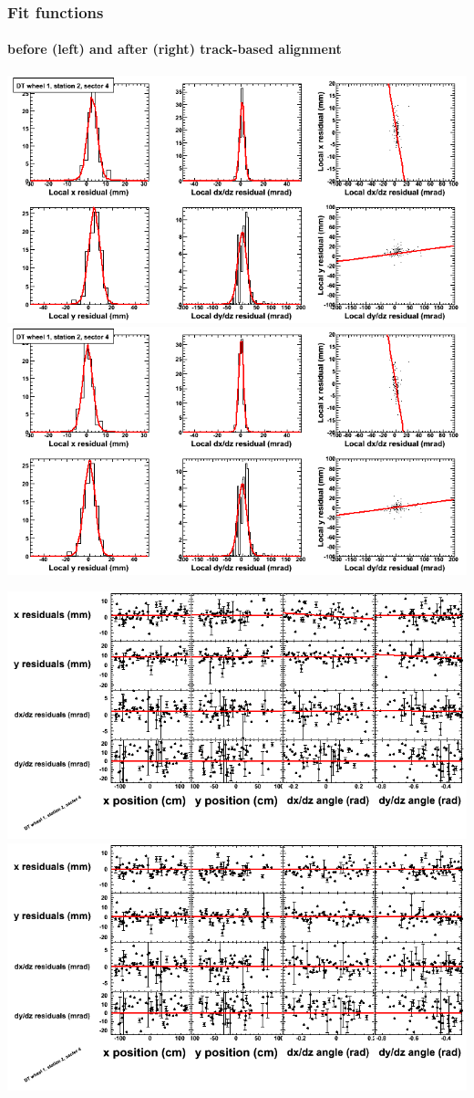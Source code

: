 \documentclass[compress]{beamer}
\begin{document}
\begin{frame}
\frametitle{Fit functions}
\framesubtitle{before (left) and after (right) track-based alignment}
\includegraphics[width=0.5\linewidth]{fitfunctions_re01/MBwhDst2sec04_bellcurves.png} \includegraphics[width=0.5\linewidth]{fitfunctions_re05/MBwhDst2sec04_bellcurves.png}

\includegraphics[width=0.5\linewidth]{fitfunctions_re01/MBwhDst2sec04_polynomials.png} \includegraphics[width=0.5\linewidth]{fitfunctions_re05/MBwhDst2sec04_polynomials.png}
\end{frame}
\end{document}
